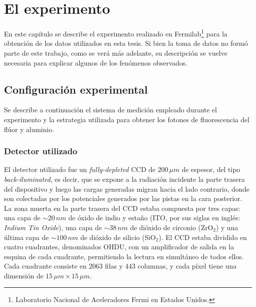 \chapter{El experimento \label{chap:ConfiguracionExperimental}}

\noindent En este capítulo se describe el experimento realizado en Fermilab\footnote{Laboratorio Nacional de Aceleradores Fermi en Estados Unidos.} para la obtención de los datos utilizados en esta tesis. Si bien la toma de datos no formó parte de este trabajo, como se verá más adelante, su descripción se vuelve necesaria para explicar algunos de los fenómenos observados.

\section{Configuración experimental}
\noindent Se describe a continuación el sistema de medición empleado durante el experimento y la estrategia utilizada para obtener los fotones de fluorescencia del flúor y aluminio.

\subsection{Detector utilizado \label{subsec:detector}}
\noindent El detector utilizado fue un \textit{fully-depleted} CCD de $200\,\si{\mu m}$ de espesor, del tipo \textit{back-iluminated}, es decir, que se expone a la radiación incidente la parte trasera del dispositivo y luego las cargas generadas migran hacia el lado contrario, donde son colectadas por los potenciales generados por las pistas en la cara posterior. La zona muerta en la parte trasera del CCD estaba compuesta por tres capas: una capa de $\sim 20\,\si{nm}$ de óxido de indio y estaño (ITO, por sus siglas en inglés: \textit{Indium Tin Oxide}), una capa de $\sim 38\,\si{nm}$ de dióxido de circonio (ZrO$_{2}$) y una última capa de $\sim 100\,\si{nm}$ de dióxido de silicio (SiO$_{2}$). El CCD estaba dividido en cuatro cuadrantes, denominados OHDU, con un amplificador de salida en la esquina de cada cuadrante, permitiendo la lectura en simultáneo de todos ellos. Cada cuadrante consiste en $2063$ filas y $443$ columnas, y cada píxel tiene una dimensión de $15\,\si{\mu m} \times 15\,\si{\mu m}$.

